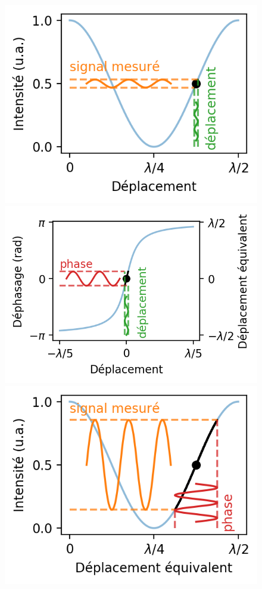 \documentclass[12pt,a4paper]{article}
\begin{document}
\begin{figure}
\includegraphics[scale=0.75]{figures/michelson_response.png}
\includegraphics[scale=0.75]{figures/cavity_phase_response.png}
\includegraphics[scale=0.75]{figures/michelson_and_cavity_response.png}

\end{figure}
\end{document}
